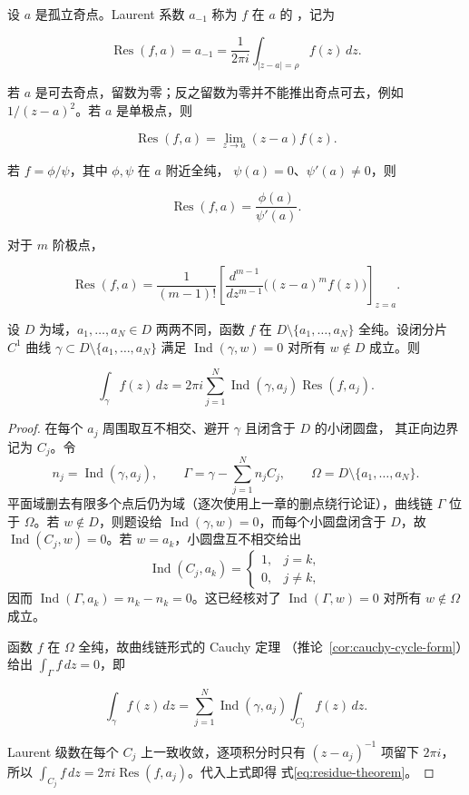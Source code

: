 设 \(a\) 是孤立奇点。Laurent 系数 \(a_{-1}\) 称为 \(f\) 在 \(a\) 的
，记为

\[
 \operatorname{Res}(f,a)=a_{-1}
 =\frac1{2\pi i}\int_{|z-a|=\rho}f(z)\,dz.
\]

若 \(a\) 是可去奇点，留数为零；反之留数为零并不能推出奇点可去，例如
\(1/(z-a)^2\)。若 \(a\) 是单极点，则

\[
 \operatorname{Res}(f,a)=\lim_{z\to a}(z-a)f(z).
\]

若 \(f=\phi/\psi\)，其中 \(\phi,\psi\) 在 \(a\) 附近全纯，
\(\psi(a)=0\)、\(\psi'(a)\ne0\)，则

\[
 \operatorname{Res}(f,a)=\frac{\phi(a)}{\psi'(a)}.
\]

对于 \(m\) 阶极点，

\begin{equation}
 \operatorname{Res}(f,a)
 =\frac1{(m-1)!}
 \left[\frac{d^{m-1}}{dz^{m-1}}\bigl((z-a)^m f(z)\bigr)\right]_{z=a}.
 \label{eq:residue-pole-formula}
\end{equation}

\begin{theorem}[留数定理]
\label{thm:residue-theorem}
设 \(D\) 为域，\(a_1,\ldots,a_N\in D\) 两两不同，函数 \(f\) 在
\(D\setminus\{a_1,\ldots,a_N\}\) 全纯。设闭分片 \(C^1\) 曲线
\(\gamma\subset D\setminus\{a_1,\ldots,a_N\}\) 满足
\(\operatorname{Ind}(\gamma,w)=0\) 对所有 \(w\notin D\) 成立。则

\begin{equation}
 \int_\gamma f(z)\,dz
 =2\pi i\sum_{j=1}^N
 \operatorname{Ind}(\gamma,a_j)\operatorname{Res}(f,a_j).
 \label{eq:residue-theorem}
\end{equation}
\end{theorem}

\begin{proof}
在每个 \(a_j\) 周围取互不相交、避开 \(\gamma\) 且闭含于 \(D\) 的小闭圆盘，
其正向边界记为 \(C_j\)。令
\[
 n_j=\operatorname{Ind}(\gamma,a_j),\qquad
 \Gamma=\gamma-\sum_{j=1}^N n_jC_j,\qquad
 \Omega=D\setminus\{a_1,\ldots,a_N\}.
\]
平面域删去有限多个点后仍为域（逐次使用上一章的删点绕行论证），曲线链
\(\Gamma\) 位于 \(\Omega\)。若 \(w\notin D\)，则题设给
\(\operatorname{Ind}(\gamma,w)=0\)，而每个小圆盘闭含于 \(D\)，故
\(\operatorname{Ind}(C_j,w)=0\)。若 \(w=a_k\)，小圆盘互不相交给出
\[
 \operatorname{Ind}(C_j,a_k)=
 \begin{cases}1,&j=k,\\0,&j\ne k,
 \end{cases}
\]
因而 \(\operatorname{Ind}(\Gamma,a_k)=n_k-n_k=0\)。这已经核对了
\(\operatorname{Ind}(\Gamma,w)=0\) 对所有 \(w\notin\Omega\) 成立。

函数 \(f\) 在 \(\Omega\) 全纯，故曲线链形式的 Cauchy 定理
（推论~\ref{cor:cauchy-cycle-form}）给出 \(\int_\Gamma f\,dz=0\)，即

\[
 \int_\gamma f(z)\,dz
 =\sum_{j=1}^N\operatorname{Ind}(\gamma,a_j)\int_{C_j}f(z)\,dz.
\]

Laurent 级数在每个 \(C_j\) 上一致收敛，逐项积分时只有
\((z-a_j)^{-1}\) 项留下 \(2\pi i\)，所以
\(\int_{C_j}f\,dz=2\pi i\operatorname{Res}(f,a_j)\)。代入上式即得
式\eqref{eq:residue-theorem}。
\end{proof}

